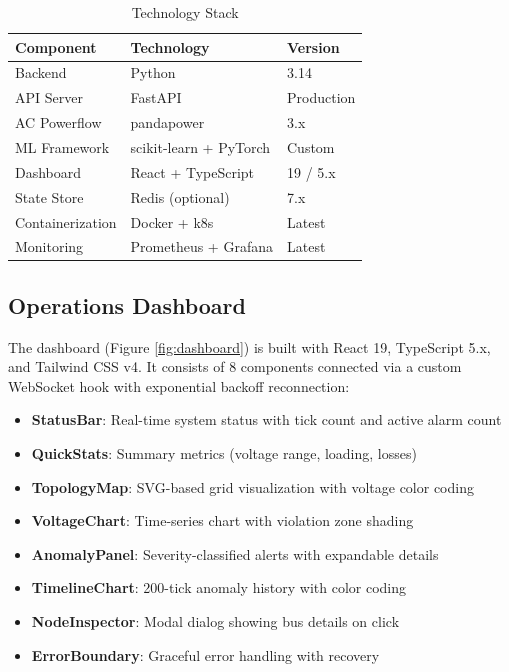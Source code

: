 \documentclass[conference]{IEEEtran}
\begin{document}
\begin{table}[h]
\centering
\caption{Technology Stack}
\label{tab:tech}
\begin{tabular}{@{}lll@{}}
\toprule
\textbf{Component} & \textbf{Technology} & \textbf{Version} \\
\midrule
Backend & Python & 3.14 \\
API Server & FastAPI & Production \\
AC Powerflow & pandapower & 3.x \\
ML Framework & scikit-learn + PyTorch & Custom \\
Dashboard & React + TypeScript & 19 / 5.x \\
State Store & Redis (optional) & 7.x \\
Containerization & Docker + k8s & Latest \\
Monitoring & Prometheus + Grafana & Latest \\
\bottomrule
\end{tabular}
\end{table}

\subsection{Operations Dashboard}

The dashboard (Figure \ref{fig:dashboard}) is built with React 19, TypeScript 5.x, and Tailwind CSS v4. It consists of 8 components connected via a custom WebSocket hook with exponential backoff reconnection:

\begin{itemize}
\item \textbf{StatusBar}: Real-time system status with tick count and active alarm count
\item \textbf{QuickStats}: Summary metrics (voltage range, loading, losses)
\item \textbf{TopologyMap}: SVG-based grid visualization with voltage color coding
\item \textbf{VoltageChart}: Time-series chart with violation zone shading
\item \textbf{AnomalyPanel}: Severity-classified alerts with expandable details
\item \textbf{TimelineChart}: 200-tick anomaly history with color coding
\item \textbf{NodeInspector}: Modal dialog showing bus details on click
\item \textbf{ErrorBoundary}: Graceful error handling with recovery
\end{itemize}
\end{document}
